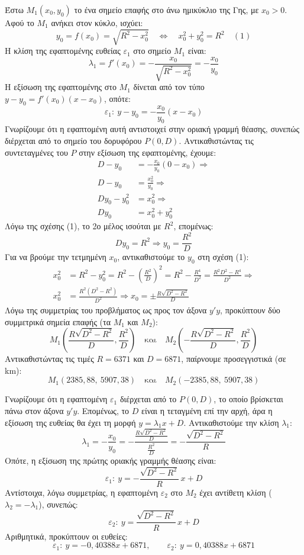 \begin{alist}
\item Έστω $M_1(x_0,y_0)$ το ένα σημείο επαφής στο άνω ημικύκλιο της Γης, με $x_0>0$. Αφού το $M_1$ ανήκει στον κύκλο, ισχύει:
\[y_0=f(x_0)=\sqrt{R^2-x_0^2} \quad\Leftrightarrow\quad x_0^2+y_0^2=R^2 \quad (1)\]
Η κλίση της εφαπτομένης ευθείας $\varepsilon_1$ στο σημείο $M_1$ είναι:
\[\lambda_1 = f'(x_0)=-\frac{x_0}{\sqrt{R^2-x_0^2}}=-\frac{x_0}{y_0}\]
Η εξίσωση της εφαπτομένης στο $M_1$ δίνεται από τον τύπο $y-y_0=f'(x_0)(x-x_0)$, οπότε:
\[\varepsilon_1: \ y-y_0=-\frac{x_0}{y_0}(x-x_0)\]
Γνωρίζουμε ότι η εφαπτομένη αυτή αντιστοιχεί στην οριακή γραμμή θέασης, συνεπώς διέρχεται από το σημείο του δορυφόρου $P(0,D)$. Αντικαθιστώντας τις συντεταγμένες του $P$ στην εξίσωση της εφαπτομένης, έχουμε:
\begin{align*}
    D-y_0 &= -\frac{x_0}{y_0}(0-x_0) \Rightarrow \\
    D-y_0 &= \frac{x_0^2}{y_0} \Rightarrow \\
    D y_0 - y_0^2 &= x_0^2 \Rightarrow \\
    D y_0 &= x_0^2+y_0^2
\end{align*}
Λόγω της σχέσης (1), το 2ο μέλος ισούται με $R^2$, επομένως:
\[D y_0 = R^2 \Rightarrow y_0=\frac{R^2}{D}\]
Για να βρούμε την τετμημένη $x_0$, αντικαθιστούμε το $y_0$ στη σχέση (1):
\begin{align*}
    x_0^2 &= R^2-y_0^2 = R^2-\left(\frac{R^2}{D}\right)^2 = R^2 - \frac{R^4}{D^2} = \frac{R^2 D^2 - R^4}{D^2} \Rightarrow \\
    x_0^2 &= \frac{R^2(D^2-R^2)}{D^2} \Rightarrow x_0 = \pm \frac{R\sqrt{D^2-R^2}}{D}
\end{align*}
Λόγω της συμμετρίας του προβλήματος ως προς τον άξονα $y'y$, προκύπτουν δύο συμμετρικά σημεία επαφής (τα $M_1$ και $M_2$):
\[M_1\left(\frac{R\sqrt{D^2-R^2}}{D}, \frac{R^2}{D}\right) \quad \text{και} \quad M_2\left(-\frac{R\sqrt{D^2-R^2}}{D}, \frac{R^2}{D}\right)\]
Αντικαθιστώντας τις τιμές $R=6371$ και $D=6871$, παίρνουμε προσεγγιστικά (σε \si{km}):
\[M_1(2385{,}88,\ 5907{,}38) \quad \text{και} \quad M_2(-2385{,}88,\ 5907{,}38)\]

\item Γνωρίζουμε ότι η εφαπτομένη $\varepsilon_1$ διέρχεται από το $P(0, D)$, το οποίο βρίσκεται πάνω στον άξονα $y'y$. Επομένως, το $D$ είναι η τεταγμένη επί την αρχή, άρα η εξίσωση της ευθείας θα έχει τη μορφή $y = \lambda_1 x + D$.
Αντικαθιστούμε την κλίση $\lambda_1$:
\[\lambda_1 = -\frac{x_0}{y_0} = -\frac{\frac{R\sqrt{D^2-R^2}}{D}}{\frac{R^2}{D}} = -\frac{\sqrt{D^2-R^2}}{R}\]
Οπότε, η εξίσωση της πρώτης οριακής γραμμής θέασης είναι:
\[\varepsilon_1: \ y = -\frac{\sqrt{D^2-R^2}}{R}\,x + D\]
Αντίστοιχα, λόγω συμμετρίας, η εφαπτομένη $\varepsilon_2$ στο $M_2$ έχει αντίθετη κλίση ($\lambda_2 = -\lambda_1$), συνεπώς:
\[\varepsilon_2: \ y = \frac{\sqrt{D^2-R^2}}{R}\,x + D\]
Αριθμητικά, προκύπτουν οι ευθείες:
\[\varepsilon_1:\ y=-0{,}40388x+6871, \qquad \varepsilon_2:\ y=0{,}40388x+6871\]


\end{alist}
